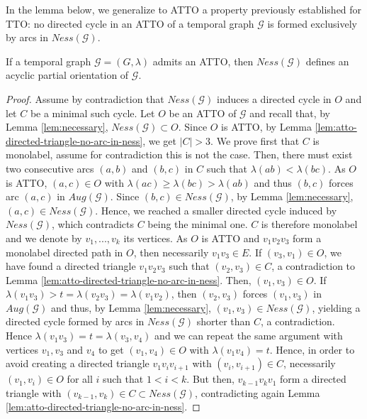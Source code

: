 \documentclass[runningheads]{llncs}
\def\mG{\mathcal{G}}
\begin{document}
In the lemma below, we generalize to ATTO a property previously established for TTO: no directed cycle in an ATTO of a temporal graph $\mG$ is formed exclusively by arcs in $Ness(\mG)$.
\begin{lemma}
\label{lem:ness-acyclic}
If a temporal graph $\mathcal{G}=(G,\lambda)$ admits an ATTO, then $Ness(\mathcal{G})$ defines an acyclic partial orientation of $\mG$.
\end{lemma}
\begin{proof}
 Assume by contradiction that $Ness(\mathcal{G})$ induces a directed cycle in $O$ and let $C$ be a minimal such cycle. Let $O$ be an ATTO of $\mathcal{G}$ and recall that, by Lemma \ref{lem:necessary},  $Ness(\mG)\subset O$. Since $O$ is ATTO, by Lemma \ref{lem:atto-directed-triangle-no-arc-in-ness}, we get $|C| > 3$. We prove first that $C$ is monolabel, assume for contradiction this is not the case. Then, there must exist two consecutive arcs $(a,b)$ and $(b, c)$ in $C$ such that $\lambda(ab)<\lambda(bc)$. As $O$ is ATTO,  $(a,c) \in O$ with $\lambda(ac) \geq \lambda(bc) > \lambda(ab)$ and thus $(b,c)$ forces arc $(a,c)$ in $Aug(\mathcal{G})$. Since $(b,c) \in Ness(\mathcal{G})$, by Lemma \ref{lem:necessary}, $(a,c) \in Ness(\mathcal{G})$. Hence, we reached a smaller directed cycle induced by $Ness(\mathcal{G})$, which contradicts $C$ being the minimal one. $C$ is therefore monolabel and we denote by $v_1, ..., v_k$ its vertices. As $O$ is ATTO and $v_1v_2v_3$ form a monolabel directed path in $O$, then necessarily $v_1v_3 \in E$. If $(v_3,v_1) \in O$, we have found a directed triangle $v_1v_2v_3$ such that $(v_2,v_3) \in C$, a contradiction to Lemma  \ref{lem:atto-directed-triangle-no-arc-in-ness}. Then, $(v_1,v_3) \in O$. If $\lambda(v_1v_3) > t =\lambda(v_2v_3) =  \lambda(v_1v_2)$, then $(v_2,v_3)$ forces $(v_1,v_3)$ in $Aug(\mG)$ and thus, by Lemma \ref{lem:necessary}, $(v_1,v_3)\in Ness(\mG)$, yielding a directed cycle formed by arcs in $Ness(\mG)$ shorter than $C$, a contradiction. Hence $\lambda(v_1v_3) = t=\lambda(v_3,v_4)$ and we can repeat the same argument with vertices $v_1,v_3$ and $v_4$ to get $(v_1,v_4) \in O$ with $\lambda(v_1v_4)=t$. Hence, in order to avoid creating a directed triangle $v_1v_iv_{i+1}$ with $(v_i,v_{i+1}) \in C$, necessarily $(v_1,v_i)\in O$ for all $i$ such that $1 < i < k$. But then, $v_{k-1}v_kv_1$ form a directed triangle with $(v_{k-1},v_k) \in C\subset Ness(\mG)$, contradicting again Lemma \ref{lem:atto-directed-triangle-no-arc-in-ness}.
\end{proof}
\end{document}
